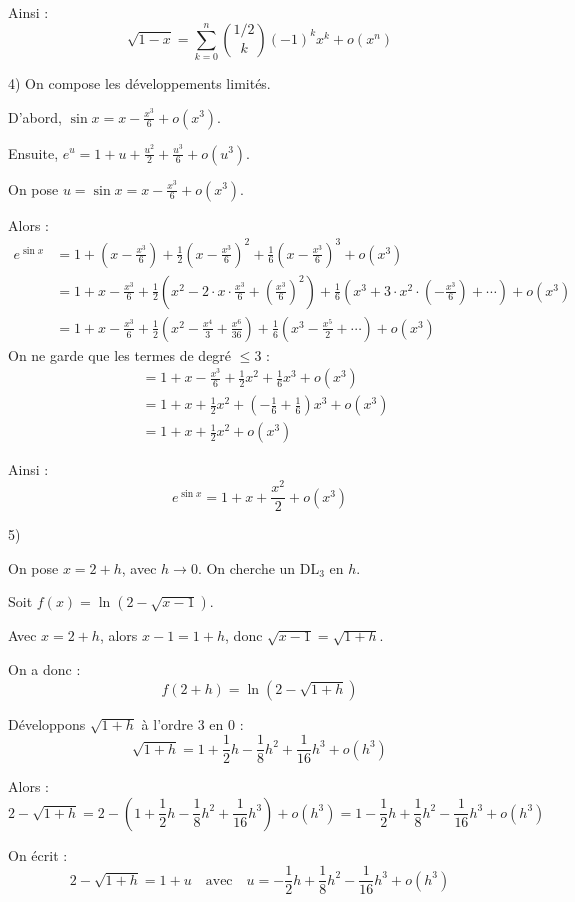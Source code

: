Ainsi :
\[
\sqrt{1-x} = \sum_{k=0}^n \binom{1/2}{k} (-1)^k x^k + o(x^n)
\]

4)
On compose les développements limités.

D'abord, $\sin x = x - \frac{x^3}{6} + o(x^3)$.

Ensuite, $e^u = 1 + u + \frac{u^2}{2} + \frac{u^3}{6} + o(u^3)$.

On pose $u = \sin x = x - \frac{x^3}{6} + o(x^3)$.

Alors :
\begin{align*}
e^{\sin x} &= 1 + \left(x - \frac{x^3}{6}\right) + \frac{1}{2} \left(x - \frac{x^3}{6}\right)^2 + \frac{1}{6} \left(x - \frac{x^3}{6}\right)^3 + o(x^3) \\
&= 1 + x - \frac{x^3}{6} + \frac{1}{2} \left(x^2 - 2 \cdot x \cdot \frac{x^3}{6} + \left(\frac{x^3}{6}\right)^2\right) + \frac{1}{6} \left(x^3 + 3 \cdot x^2 \cdot \left(-\frac{x^3}{6}\right) + \cdots\right) + o(x^3) \\
&= 1 + x - \frac{x^3}{6} + \frac{1}{2} \left(x^2 - \frac{x^4}{3} + \frac{x^6}{36}\right) + \frac{1}{6} \left(x^3 - \frac{x^5}{2} + \cdots\right) + o(x^3)
\end{align*}
On ne garde que les termes de degré $\leq 3$ :
\begin{align*}
&= 1 + x - \frac{x^3}{6} + \frac{1}{2} x^2 + \frac{1}{6} x^3 + o(x^3) \\
&= 1 + x + \frac{1}{2} x^2 + \left(-\frac{1}{6} + \frac{1}{6}\right) x^3 + o(x^3) \\
&= 1 + x + \frac{1}{2} x^2 + o(x^3)
\end{align*}

Ainsi :
\[
e^{\sin x} = 1 + x + \frac{x^2}{2} + o(x^3)
\]

5)

On pose $x = 2 + h$, avec $h \to 0$. On cherche un DL$_3$ en $h$.

Soit $f(x) = \ln(2 - \sqrt{x-1})$.

Avec $x = 2 + h$, alors $x - 1 = 1 + h$, donc $\sqrt{x-1} = \sqrt{1+h}$.

On a donc :
\[
f(2+h) = \ln(2 - \sqrt{1+h})
\]

Développons $\sqrt{1+h}$ à l'ordre 3 en 0 :
\[
\sqrt{1+h} = 1 + \frac{1}{2} h - \frac{1}{8} h^2 + \frac{1}{16} h^3 + o(h^3)
\]

Alors :
\[
2 - \sqrt{1+h} = 2 - \left(1 + \frac{1}{2} h - \frac{1}{8} h^2 + \frac{1}{16} h^3\right) + o(h^3) = 1 - \frac{1}{2} h + \frac{1}{8} h^2 - \frac{1}{16} h^3 + o(h^3)
\]

On écrit :
\[
2 - \sqrt{1+h} = 1 + u \quad \text{avec} \quad u = -\frac{1}{2} h + \frac{1}{8} h^2 - \frac{1}{16} h^3 + o(h^3)
\]

